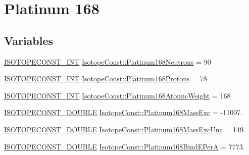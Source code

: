 \hypertarget{group___isotope_const-_platinum-_pt168}{}\section{Platinum 168}
\label{group___isotope_const-_platinum-_pt168}
\subsection*{Variables}
\begin{DoxyCompactItemize}
\item 
\mbox{\hyperlink{group___isotope_const-_macros_ga5f18360b3e99483a35c32d789e62621c}{I\+S\+O\+T\+O\+P\+E\+C\+O\+N\+S\+T\+\_\+\+I\+NT}} \mbox{\hyperlink{group___isotope_const-_platinum-_pt168_ga0fc339b1141f567ad0ac1f5af41e4908}{Isotope\+Const\+::\+Platinum168\+Neutrons}} = 90
\item 
\mbox{\hyperlink{group___isotope_const-_macros_ga5f18360b3e99483a35c32d789e62621c}{I\+S\+O\+T\+O\+P\+E\+C\+O\+N\+S\+T\+\_\+\+I\+NT}} \mbox{\hyperlink{group___isotope_const-_platinum-_pt168_ga699f206b505f675aa4486260e657c152}{Isotope\+Const\+::\+Platinum168\+Protons}} = 78
\item 
\mbox{\hyperlink{group___isotope_const-_macros_ga5f18360b3e99483a35c32d789e62621c}{I\+S\+O\+T\+O\+P\+E\+C\+O\+N\+S\+T\+\_\+\+I\+NT}} \mbox{\hyperlink{group___isotope_const-_platinum-_pt168_ga91e38bede1b4e8f7bbd1a0a964498033}{Isotope\+Const\+::\+Platinum168\+Atomic\+Weight}} = 168
\item 
\mbox{\hyperlink{group___isotope_const-_macros_ga8f45a7272ce02c0b4c65c44636ed719a}{I\+S\+O\+T\+O\+P\+E\+C\+O\+N\+S\+T\+\_\+\+D\+O\+U\+B\+LE}} \mbox{\hyperlink{group___isotope_const-_platinum-_pt168_ga24c53773409b5d7ad7027ba3bea93b4e}{Isotope\+Const\+::\+Platinum168\+Mass\+Exc}} = -\/11007.
\item 
\mbox{\hyperlink{group___isotope_const-_macros_ga8f45a7272ce02c0b4c65c44636ed719a}{I\+S\+O\+T\+O\+P\+E\+C\+O\+N\+S\+T\+\_\+\+D\+O\+U\+B\+LE}} \mbox{\hyperlink{group___isotope_const-_platinum-_pt168_gafba52561accd77620d30a6753743724e}{Isotope\+Const\+::\+Platinum168\+Mass\+Exc\+Unc}} = 149.
\item 
\mbox{\hyperlink{group___isotope_const-_macros_ga8f45a7272ce02c0b4c65c44636ed719a}{I\+S\+O\+T\+O\+P\+E\+C\+O\+N\+S\+T\+\_\+\+D\+O\+U\+B\+LE}} \mbox{\hyperlink{group___isotope_const-_platinum-_pt168_ga9d6eb0b08e49d4e4fd6f88e23c8623dc}{Isotope\+Const\+::\+Platinum168\+Bind\+E\+PerA}} = 7773.
\item 

\end{DoxyCompactItemize}
